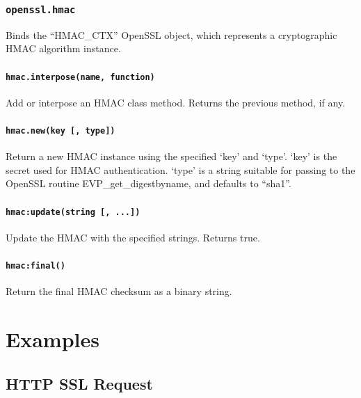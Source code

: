 \documentclass[11pt, oneside]{memoir}
\newcommand*{\fn}[1]{\texttt{#1}\xspace}
\newcounter{toccols}
\newenvironment{Module}[1]{
	\subsection{\texttt{#1}}
	\addtocontents{toc}{
		\protect\begin{multicols}{\value{toccols}}
	}
}{
	\addtocontents{toc}{\protect\end{multicols}}
}
\begin{document}
\begin{Module}{openssl.hmac}

Binds the ``HMAC\_CTX'' OpenSSL object, which represents a cryptographic HMAC algorithm instance.

\subsubsection[\fn{hmac.interpose}]{\fn{hmac.interpose(name, function)}}

Add or interpose an HMAC class method. Returns the previous method, if any.

\subsubsection[\fn{hmac.new}]{\fn{hmac.new(key [, type])}}

Return a new HMAC instance using the specified `key' and `type'. `key' is the secret used for HMAC authentication. `type' is a string suitable for passing to the OpenSSL routine EVP\_get\_digestbyname, and defaults to ``sha1''.

\subsubsection[\fn{hmac:update}]{\fn{hmac:update(string [, ...])}}

Update the HMAC with the specified strings. Returns true.

\subsubsection[\fn{hmac:final}]{\fn{hmac:final()}}

Return the final HMAC checksum as a binary string.

\end{Module}


\chapter{Examples}

\section{HTTP SSL Request}
\end{document}

